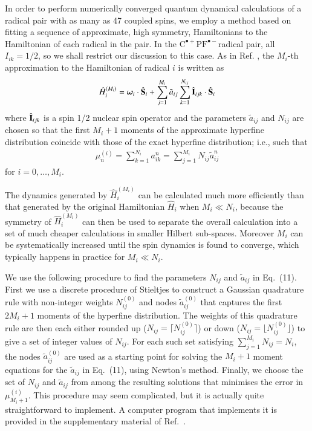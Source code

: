 \documentclass[%
aip,
jcp,%
amsmath,amssymb,
reprint%
]{revtex4-1}
\renewcommand{\op}[1]{\ensuremath{\hat{#1}}}
\newcommand{\CPFrp}{$\text{C}^{\bullet +}\text{PF}^{\bullet-}$}
\begin{document}
In order to perform numerically converged quantum dynamical calculations of a radical pair with as many as 47 coupled spins, we employ a method based on fitting a sequence of approximate, high symmetry, Hamiltonians to the Hamiltonian of each radical in the pair.\cite{Lindoy2018} In the \CPFrp radical pair, all $I_{ik}=1/2$, so we shall restrict our discussion to this case. As in Ref. , the $M_i$-th approximation to the Hamiltonian of radical $i$ is written as
\begin{align}
\op{H}_i^{(M_i)} = \boldsymbol{\omega}_i \cdot \op{\vb{S}}_i + \sum_{j=1}^{M_i} \tilde{a}_{ij} \sum_{k=1}^{N_{ij}}\op{\vb{I}}_{ijk}\cdot \op{\vb{S}}_{i}
\end{align}
where $\op{\vb{I}}_{ijk}$ is a spin 1/2 nuclear spin operator and the parameters $\tilde{a}_{ij}$ and $N_{ij}$ are chosen so that the first $M_i+1$ moments of the approximate hyperfine distribution coincide with those of the exact hyperfine distribution; i.e., such that
\begin{align}
\mu_n^{(i)} = \sum_{k=1}^{N_i} a_{ik}^n = \sum_{j=1}^{M_i} N_{ij}\tilde{a}_{ij}^n
\end{align}
for $i=0,\ldots,M_i$. 

The dynamics generated by $\hat{H}_{i}^{(M_i)}$ can be calculated much more efficiently than that generated by the original Hamiltonian $\hat{H}_i$ when $M_i\ll N_i$, because the symmetry of $\hat{H}_{i}^{(M_i)}$ can then be used to separate the overall calculation into a set of much cheaper calculations in smaller Hilbert sub-spaces. Moreover $M_i$ can be systematically increased until the spin dynamics is found to converge, which typically happens in practice for $M_i \ll N_i$. 

We use the following procedure to find the parameters $N_{ij}$ and $\tilde{a}_{ij}$ in Eq.~(11).\cite{Lindoy2018} First we use a discrete procedure of Stieltjes\cite{Press1992} to construct a Gaussian quadrature rule with non-integer weights $N^{(0)}_{ij}$ and nodes $\tilde{a}^{(0)}_{ij}$ that captures the first $2M_{i}+1$ moments of the hyperfine distribution. The weights of this quadrature rule are then each either rounded up ($N_{ij}=\lceil {N}^{(0)}_{ij}\rceil$) or down ($N_{ij}=\lfloor {N}^{(0)}_{ij}\rfloor$) to give a set of integer values of $N_{ij}$. For each such set satisfying $\sum_{j=1}^{M_i}N_{ij}=N_i$, the nodes $\tilde{a}^{(0)}_{ij}$ are used as a starting point for solving the $M_i+1$ moment equations for the $\tilde{a}_{ij}$ in Eq.~(11), using Newton's method. Finally, we choose the set of $N_{ij}$ and $\tilde{a}_{ij}$ from among the resulting solutions that minimises the error in $\mu_{M_i+1}^{(i)}$. This procedure may seem complicated, but it is actually quite straightforward to implement. A computer program that implements it is provided in the supplementary material of Ref.~.
\end{document}
